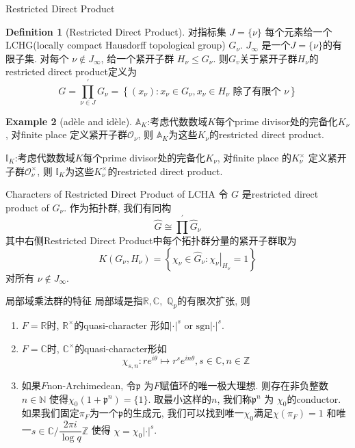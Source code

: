 \documentclass[aspectratio=169]{beamer}
\theoremstyle{definition}
\newtheorem{defn}{Definition}[section]
\newtheorem{exam}[defn]{Example}
\newcommand{\bb}[1]{\mathbb{#1}}
\newenvironment{enu}{\begin{enumerate}[(1)]}{\end{enumerate}}
\begin{document}
\begin{frame}{Restricted Direct Product}
    \begin{defn}[Restricted Direct Product]
        对指标集 $J=\{\nu\}$ 每个元素给一个LCHG(locally compact Hausdorff topological group) 
        $G_\nu$.
        $J_{\infty}$ 是一个$J=\{\nu\}$的有限子集. 
        对每个 $\nu \notin J_{\infty}$, 给一个紧开子群
        $H_\nu \leq G_\nu$. 
        则$G_v$关于紧开子群$H_\nu$的
        restricted direct product定义为
        $$
        G=\prod_{\nu \in J}^{\prime} G_\nu=\left\{\left(x_\nu\right): x_\nu \in G_\nu, x_\nu \in H_\nu \text { 除了有限个 } \nu\right\}
        $$
    \end{defn}
    \begin{exam}[adèle and idèle]
        $\mathbb{A}_K$:考虑代数数域$K$每个prime divisor处的完备化$K_\nu$, 对finite place 定义紧开子群$\mathcal{O}_\nu$, 则 
        $\mathbb{A}_K$为这些$K_\nu$的restricted direct product. 

        $\mathbb{I}_K$:考虑代数数域$K$每个prime divisor处的完备化$K_\nu$, 对finite place 的$K_\nu^\times$
        定义紧开子群$\mathcal{O}_\nu^\times$, 则 
        $\mathbb{I}_K$为这些$K_\nu^\times$的restricted direct product. 
    \end{exam}
\end{frame}
\begin{frame}{Characters of Restricted Direct Product of LCHA}
    令 $G$ 是restricted direct product of $G_\nu$. 
    作为拓扑群, 我们有同构
    $$
    \hat{G} \cong \prod^{\prime} \hat{G}_\nu
    $$
    其中右侧Restricted Direct Product中每个拓扑群分量的紧开子群取为
    $$
    K\left(G_\nu, H_\nu\right)=\left\{\chi_\nu \in \hat{G}_\nu:\left.\chi_\nu\right|_{H_\nu}=1\right\}
    $$
    对所有 $\nu \notin J_{\infty}$. 
\end{frame}
\begin{frame}{局部域乘法群的特征}
    局部域是指$\bb{R},\bb{C},$ $\bb{Q}_p$的有限次扩张, 则
    \begin{enu}
        \item $F=\mathbb{R}$时, $\mathbb{R}^\times$的quasi-character 形如$|\cdot|^s$ or $\text{sgn}|\cdot|^s $.
        \item $F=\mathbb{C}$时, 
        $\mathbb{C}^\times$的quasi-character形如
        $$
        \chi_{s, n}: r e^{i \theta} \mapsto r^s e^{i n \theta},s\in\bb{C}, n\in\bb{Z}
        $$
        \item 如果$F$non-Archimedean, 令$\mathfrak{p}$ 
        为$F$赋值环的唯一极大理想.
        则存在非负整数$n \in \mathbb{N}$ 使得$\chi_0\left(1+\mathfrak{p}^n\right)=\{1\}$. 取最小这样的$n$, 
        我们称$\mathfrak{p}^n$ 为 $\chi_0$的conductor. 
        如果我们固定$\pi_F$为一个$\mathfrak{p}$的生成元, 
        我们可以找到唯一$\chi_0$满足$\chi(\pi_F)=1$
        和唯一$s\in \bb{C}/\dfrac{2\pi i}{\log q}\bb{Z}$ 使得 $\chi=\chi_0|\cdot|^s$.
    \end{enu}
\end{frame}
\end{document}

